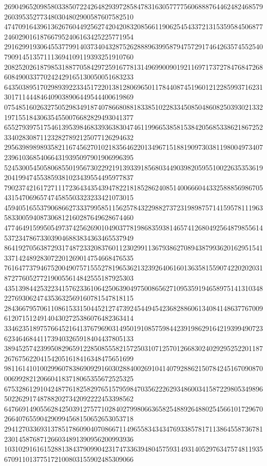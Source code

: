 \begin{DoxyCode}
      269049652098580338507224264829397285847831630577775606888764462482468579260395352773480304802900587607582510
      474709164396136267604492562742042083208566119062545433721315359584506877246029016187667952406163425225771954
      291629919306455377991403734043287526288896399587947572917464263574552540790914513571113694109119393251910760
      208252026187985318877058429725916778131496990090192116971737278476847268608490033770242429165130050051683233
      643503895170298939223345172201381280696501178440874519601212285993716231301711444846409038906449544400619869
      075485160263275052983491874078668088183385102283345085048608250393021332197155184306354550076682829493041377
      655279397517546139539846833936383047461199665385815384205685338621867252334028308711232827892125077126294632
      295639898989358211674562701021835646220134967151881909730381198004973407239610368540664319395097901906996395
      524530054505806855019567302292191393391856803449039820595510022635353619204199474553859381023439554495977837
      790237421617271117236434354394782218185286240851400666044332588856986705431547069657474585503323233421073015
      459405165537906866273337995851156257843229882737231989875714159578111963583300594087306812160287649628674460
      477464915995054973742562690104903778198683593814657412680492564879855614537234786733039046883834363465537949
      864192705638729317487233208376011230299113679386270894387993620162951541337142489283072201269014754668476535
      761647737946752004907571555278196536213239264061601363581559074220202031872776052772190055614842555187925303
      435139844253223415762336106425063904975008656271095359194658975141310348227693062474353632569160781547818115
      284366795706110861533150445212747392454494542368288606134084148637767009612071512491404302725386076482363414
      334623518975766452164137679690314950191085759844239198629164219399490723623464684411739403265918404437805133
      389452574239950829659122850855582157250310712570126683024029295252201187267675622041542051618416348475651699
      981161410100299607838690929160302884002691041407928862150784245167090870006992821206604183718065355672525325
      675328612910424877618258297651579598470356222629348600341587229805349896502262917487882027342092222453398562
      647669149055628425039127577102840279980663658254889264880254566101729670266407655904290994568150652653053718
      294127033693137851786090407086671149655834343476933857817113864558736781230145876871266034891390956200993936
      103102916161528813843790990423174733639480457593149314052976347574811935670911013775172100803155902485309066

\end{DoxyCode}
